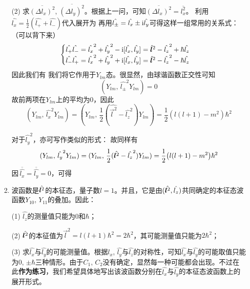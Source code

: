 \begin{enumerate}[label=2.\arabic*, leftmargin=-0.5mm]
(2) 求$\overline{(\Delta l_x)^2}$, $\overline{(\Delta l_y)^2}$。根据上一问，可知$\overline{(\Delta l_x)^2}=\overline{l_x^2}$。
利用$\hat{l_x}=\frac{1}{2}(\hat{l_+}+\hat{l_-})$代入展开为
再用$\hat{l_\pm}=\hat{l_x}\pm \mathrm{i}\hat{l_y}$可得这样一组常用的关系式：（可以背下来）
{\color{red}\[\begin{cases}
\hat{l_+}\hat{l_-}=\hat{l_x}^2+\hat{l_y}^2-\mathrm{i}[\hat{l_x},\hat{l_y}] =  \hat{\boldsymbol{l}}^2-\hat{l_z}^2+\hbar \hat{l_z}\\
\hat{l_-}\hat{l_+}=\hat{l_x}^2+\hat{l_y}^2+\mathrm{i}[\hat{l_x},\hat{l_y}] =  \hat{\boldsymbol{l}}^2-\hat{l_z}^2-\hbar \hat{l_z}
\end{cases}\]}
因此我们有
我们将它作用于$Y_{lm}$态。很显然，由球谐函数正交性可知
\[(Y_{lm},\,\hat{l_\pm}^2 Y_{lm}) = 0\]
故前两项在$Y_{lm}$上的平均为0，因此
\[(Y_{lm},\,\hat{l_x}^2 Y_{lm}) = (Y_{lm},\,\frac{1}{2}(\hat{\vec{l}^2}-\hat{l_z}^2) Y_{lm}) = \frac{1}{2}(l(l+1)-m^2)\hbar^2\]

对于$\hat{l_y}^2$，亦可写作类似的形式：
故同样有
\[(Y_{lm},\,\hat{l_y}^2 Y_{lm}) = (Y_{lm},\,\frac{1}{2}(\hat{\boldsymbol{l}^2}-\hat{l_z}^2) Y_{lm}) = \frac{1}{2}\qty(l(l+1)-m^2)\hbar^2\]
因$\,\overline{\hat{l_x}}=\overline{\hat{l_y}}=0$，可得

\item
波函数是$\hat{\boldsymbol{l}^2}$的本征态，量子数$l=1$。并且，它是由$(\hat{\boldsymbol{l}^2},\hat{l_z})$共同确定的本征态波函数$Y_{10}$, $Y_{11}$的叠加。因此：

(1) $\hat{l_z}$的测量值只能为$0$和$\hbar$；

(2) $\hat{\boldsymbol{l}^2}$的本征值为$\vec{l}^2 = l(l+1)\hbar^2=2\hbar^2$，其可能测量值只能为$2\hbar^2$；

(3) 求$\hat{l_x}$与$\hat{l_y}$的可能测量值。根据$\hat{l_x}$, $\hat{l_y}$与$\hat{l_z}$的对称性，可知$\hat{l_x}$与$\hat{l_y}$的可能取值只能为0, $\pm\hbar$三种情形。由于$C_1$, $C_2$没有确定，显然每一种可能都会出现。不过在此\textbf{作为练习}，我们希望具体地写出该波函数分别在$\hat{l_x}$与$\hat{l_y}$的本征态波函数上的展开形式。


\end{enumerate}
